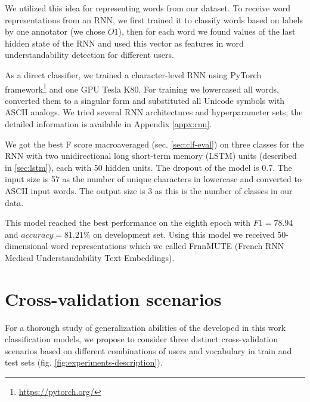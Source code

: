 We utilized this idea for representing words from our dataset. To receive word representations from an RNN, we first trained it to classify words based on labels by one annotator (we chose $O1$), then for each word we found values of the last hidden state of the RNN and used this vector as features in word understandability detection for different users.

As a direct classifier, we trained a character-level RNN using PyTorch framework\footnote{\url{https://pytorch.org/}} and one GPU Tesla K80. For training we lowercased all words, converted them to a singular form and substituted all Unicode symbols with ASCII analogs.  We tried several RNN architectures and hyperparameter sets; the detailed information is available in Appendix \ref{appx:rnn}. 

We got the best F score macroaveraged (sec. \ref{sec:clf-eval}) on three classes for the RNN with two unidirectional long short-term memory (LSTM) units (described in \ref{sec:lstm}), each with 50 hidden units. The dropout of the model is 0.7. The input size is 57 as the number of unique characters in lowercase and converted to ASCII input words. The output size is 3 as this is the number of classes in our data.

This model reached the best performance on the eighth epoch with $F1= 78.94$ and $accuracy = 81.21\%$ on development set. Using this model we received 50-dimensional word representations which we called FrnnMUTE (French RNN Medical Understandability Text Embeddings). 


\section{Cross-validation scenarios}
For a thorough study of generalization abilities of the developed in this work classification models, we propose to consider three distinct cross-validation scenarios based on different combinations of users and vocabulary in train and test sets (fig. \ref{fig:experiments-description}).

